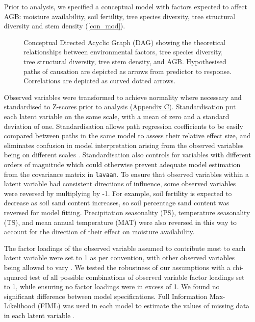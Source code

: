 \documentclass[11pt,a4paper]{article}
\begin{document}
Prior to analysis, we specified a conceptual model with factors expected to affect AGB: moisture availability, soil fertility, tree species diversity, tree structural diversity and stem density (\autoref{con_mod}). 

\begin{figure}[H]
\centering
	
	\caption{Conceptual Directed Acyclic Graph (DAG) showing the theoretical relationships between environmental factors, tree species diversity, tree structural diversity, tree stem density, and AGB. Hypothesised paths of causation are depicted as arrows from predictor to response. Correlations are depicted as curved dotted arrows.}
	\label{con_mod}
\end{figure}

Observed variables were transformed to achieve normality where necessary and standardised to Z-scores prior to analysis (\hyperref[appendixc]{Appendix C}). Standardisation put each latent variable on the same scale, with a mean of zero and a standard deviation of one. Standardisation allows path regression coefficients to be easily compared between paths in the same model to assess their relative effect size, and eliminates confusion in model interpretation arising from the observed variables being on different scales \citep{Beaujean2014}. Standardisation also controls for variables with different orders of magnitude which could otherwise prevent adequate model estimation from the covariance matrix in \verb|lavaan|. To ensure that observed variables within a latent variable had consistent directions of influence, some observed variables were reversed by multiplying by -1. For example, soil fertility is expected to decrease as soil sand content increases, so soil percentage sand content was reversed for model fitting. Precipitation seasonality (PS), temperature seasonality (TS), and mean annual temperature (MAT) were also reversed in this way to account for the direction of their effect on moisture availability.


The factor loadings of the observed variable assumed to contribute most to each latent variable were set to 1 as per convention, with other observed variables being allowed to vary \citep{Beaujean2014}.  We tested the robustness of our assumptions with a chi-squared test of all possible combinations of observed variable factor loadings set to 1, while ensuring no factor loadings were in excess of 1. We found no significant difference between model specifications. Full Information Max-Likelihood (FIML) was used in each model to estimate the values of missing data in each latent variable \citep{Cham2017}.
\end{document}
